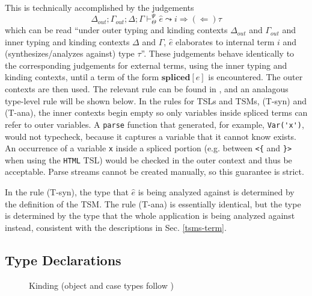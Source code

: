 \documentclass{sig-alternate}[10pt]
\newcommand{\flyingbox}[1]{\fbox{{#1}}}
\newcommand{\mycaption}[1]{\vspace{-4px}\caption{#1}\vspace{-2px}}
\begin{document}
This is technically accomplished by the judgements \[\Delta_{out}; \Gamma_{out}; \Delta; \Gamma \vdash_{\Theta}^{\Psi} \hat{e} \leadsto i {\Rightarrow}{(\Leftarrow)} \tau\]  which can be read ``under outer typing and kinding contexts $\Delta_{out}$ and $\Gamma_{out}$ and inner typing and kinding contexts $\Delta$ and $\Gamma$,  $\hat{e}$ elaborates to internal term $i$ and (synthesizes/analyzes against) type $\tau$''. These judgements behave identically to the corresponding judgements for external terms, using the inner typing and kinding contexts, until a term of the form $\textbf{spliced}[e]$ is encountered. The outer contexts are then used. The relevant rule can be found in \cite{TSLs}, and an analagous type-level rule will be shown below. 
In the rules for TSLs and TSMs, (T-syn) and (T-ana), the inner contexts begin empty so only variables inside spliced terms can refer to outer variables. A \verb|parse| function that generated, for example, \verb|Var('x')|, would not typecheck, because it captures a variable that it cannot know exists. An occurrence of a variable \verb|x| inside a spliced portion (e.g. between \verb|<{| and \verb|}>| when using the \verb|HTML| TSL) would be checked in the outer context and thus be acceptable. Parse streams cannot be created manually, so this guarantee is strict. %

In the rule (T-syn), the type that $\hat{e}$ is being analyzed against is determined by the definition of the TSM. The rule (T-ana) is essentially identical, but the type is determined by the type that the whole application is being analyzed against instead, consistent with the descriptions in Sec. \ref{tsms-term}. 


\subsection{Type Declarations}\label{declarations}




\begin{figure}[ht]
\flyingbox{$\Delta\vdash_{\Theta}\tau::\kappa$}
\begin{center}
\noLine
\BIC{}
\DP
\end{center}

\begin{center}
\noLine
\BIC{}
\DP
\end{center}
\mycaption{Kinding (object and case types follow \cite{TSLs})}
\label{kinding}
\end{figure}
\end{document}
